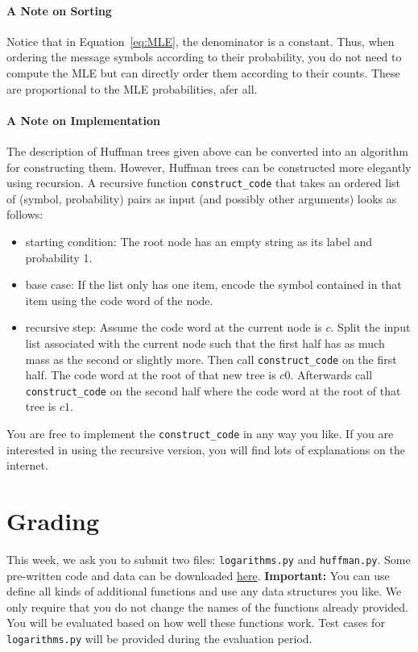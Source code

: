\documentclass[11pt, leqno, a4paper]{article}
\begin{document}
\paragraph{A Note on Sorting} Notice that in Equation~\eqref{eq:MLE}, the denominator is a constant. Thus, when ordering the message symbols according to
their probability, you do not need to compute the MLE but can directly order them according to their counts. These are proportional to the MLE probabilities,
afer all.

\paragraph{A Note on Implementation} The description of Huffman trees given above can be converted into an algorithm for constructing them. However, Huffman trees can
be constructed more elegantly using recursion. A recursive function \texttt{construct\_code} that takes an ordered list of (symbol, probability) pairs as input (and
possibly other arguments) looks as follows:
\begin{itemize}
\item starting condition: The root node has an empty string as its label and probability 1.
\item base case: If the list only has one item, encode the symbol contained in that item using the code word of the node.
\item recursive step: Assume the code word at the current node is $ c $. Split the input list associated with the current node
such that the first half has as much mass as the second or slightly more. Then call \texttt{construct\_code} on the first half. The code word
at the root of that new tree is $ c0 $. Afterwards call \texttt{construct\_code} on the second half where the code word at the root of that tree is $ c1 $.
\end{itemize} 

You are free to implement the \texttt{construct\_code} in any way you like. If you are interested in using the recursive version, you will find lots of
explanations on the internet.

\section{Grading}
This week, we ask you to submit two files: \texttt{logarithms.py} and \texttt{huffman.py}. Some pre-written code and data can be downloaded \href{https://github.com/BasicProbability/BasicProbability.github.io/raw/master/Homework/Programming/2016-17/Assignment3/assignment3_prerequisites.zip}{here}.
\textbf{Important:} You can use define all kinds of additional functions and use any data structures you like. We only require that you do not change the
names of the functions already provided. You will be evaluated based on how well these functions work. Test cases for \texttt{logarithms.py} will
be provided during the evaluation period.
\end{document}
